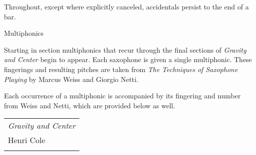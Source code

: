 \documentclass{article}
\begin{document}
Throughout, except where explicitly canceled, accidentals persist to the end of a bar.

\pagebreak

{\Large Multiphonics}

Starting in section\hspace{-.5em}{%
\parindent 0pt
\noindent
\ifx\preLilyPondExample \undefined
\else
  \expandafter\preLilyPondExample
\fi
%
\ifx\postLilyPondExample \undefined
\else
  \expandafter\postLilyPondExample
\fi
} multiphonics that recur
through the final sections of \textit{Gravity and Center} begin to appear. Each saxophone is given
a single multiphonic. These fingerings and resulting pitches are taken from \textit{The Techniques of
Saxophone Playing} by Marcus Weiss and Giorgio Netti.

Each occurrence of a multiphonic is accompanied by its fingering and number from Weiss and Netti, which
are provided below as well.

\vspace{4em}

\begin{quote}
{%
\parindent 0pt
\noindent
\ifx\preLilyPondExample \undefined
\else
  \expandafter\preLilyPondExample
\fi
%
\ifx\postLilyPondExample \undefined
\else
  \expandafter\postLilyPondExample
\fi
}
\end{quote}


\newpage

\phantom{ok}

\vfill


\begin{center}
  \begin{tabular}{l}

\textit{Gravity and Center} \\
Henri Cole \\
    \phantom{appear before me full of promise but then run away}\\
  \end{tabular}
  \end{center}

\vspace{-3em}
\end{document}
